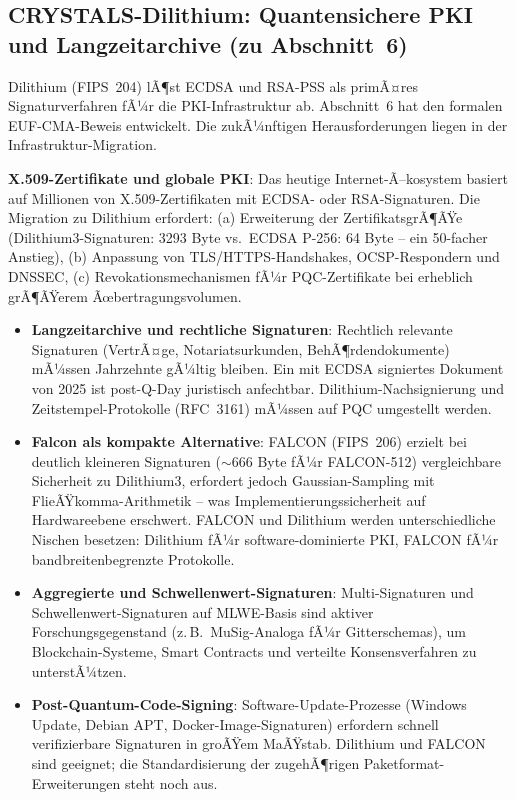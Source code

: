 ﻿\documentclass[a4paper,12pt]{article}
\theoremstyle{definition}
\begin{document}
\subsection{CRYSTALS-Dilithium: Quantensichere PKI und Langzeitarchive (zu Abschnitt~6)}

Dilithium (FIPS~204) lÃ¶st ECDSA und RSA-PSS als primÃ¤res
Signaturverfahren fÃ¼r die PKI-Infrastruktur ab. Abschnitt~6 hat
den formalen EUF-CMA-Beweis entwickelt. Die zukÃ¼nftigen
Herausforderungen liegen in der Infrastruktur-Migration.

\textbf{X.509-Zertifikate und globale PKI}: Das heutige
Internet-Ã–kosystem basiert auf Millionen von X.509-Zertifikaten
mit ECDSA- oder RSA-Signaturen. Die Migration zu Dilithium erfordert:
(a) Erweiterung der ZertifikatsgrÃ¶ÃŸe (Dilithium3-Signaturen: 3293 Byte
vs.\ ECDSA P-256: 64 Byte -- ein 50-facher Anstieg),
(b) Anpassung von TLS/HTTPS-Handshakes, OCSP-Respondern und DNSSEC,
(c) Revokationsmechanismen fÃ¼r PQC-Zertifikate bei erheblich
grÃ¶ÃŸerem Ãœbertragungsvolumen.

\begin{itemize}
  \item \textbf{Langzeitarchive und rechtliche Signaturen}:
    Rechtlich relevante Signaturen (VertrÃ¤ge, Notariatsurkunden,
    BehÃ¶rdendokumente) mÃ¼ssen Jahrzehnte gÃ¼ltig bleiben.
    Ein mit ECDSA signiertes Dokument von 2025 ist post-Q-Day
    juristisch anfechtbar. Dilithium-Nachsignierung und
    Zeitstempel-Protokolle (RFC~3161) mÃ¼ssen auf PQC umgestellt werden.
  \item \textbf{Falcon als kompakte Alternative}: FALCON (FIPS~206)
    erzielt bei deutlich kleineren Signaturen ($\sim$666 Byte fÃ¼r
    FALCON-512) vergleichbare Sicherheit zu Dilithium3, erfordert
    jedoch Gaussian-Sampling mit FlieÃŸkomma-Arithmetik --
    was Implementierungssicherheit auf Hardwareebene erschwert.
    FALCON und Dilithium werden unterschiedliche Nischen besetzen:
    Dilithium fÃ¼r software-dominierte PKI,
    FALCON fÃ¼r bandbreitenbegrenzte Protokolle.
  \item \textbf{Aggregierte und Schwellenwert-Signaturen}:
    Multi-Signaturen und Schwellenwert-Signaturen auf MLWE-Basis
    sind aktiver Forschungsgegenstand (z.\,B.\ MuSig-Analoga fÃ¼r
    Gitterschemas), um Blockchain-Systeme, Smart Contracts und
    verteilte Konsensverfahren zu unterstÃ¼tzen.
  \item \textbf{Post-Quantum-Code-Signing}: Software-Update-Prozesse
    (Windows Update, Debian APT, Docker-Image-Signaturen) erfordern
    schnell verifizierbare Signaturen in groÃŸem MaÃŸstab. Dilithium
    und FALCON sind geeignet; die Standardisierung der
    zugehÃ¶rigen Paketformat-Erweiterungen steht noch aus.
\end{itemize}
\end{document}
